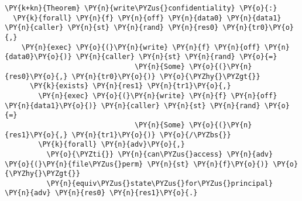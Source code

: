 \begin{BVerbatim}[commandchars=\\\{\},codes={\catcode`\$=3\catcode`\^=7\catcode`\_=8},fontsize=\footnotesize]
\PY{k+kn}{Theorem} \PY{n}{write\PYZus{}confidentiality} \PY{o}{:}
  \PY{k}{forall} \PY{n}{f} \PY{n}{off} \PY{n}{data0} \PY{n}{data1} \PY{n}{caller} \PY{n}{st} \PY{n}{rand} \PY{n}{res0} \PY{n}{tr0}\PY{o}{,}
    \PY{n}{exec} \PY{o}{(}\PY{n}{write} \PY{n}{f} \PY{n}{off} \PY{n}{data0}\PY{o}{)} \PY{n}{caller} \PY{n}{st} \PY{n}{rand} \PY{o}{=}
                               \PY{n}{Some} \PY{o}{(}\PY{n}{res0}\PY{o}{,} \PY{n}{tr0}\PY{o}{)} \PY{o}{\PYZhy{}\PYZgt{}}
      \PY{k}{exists} \PY{n}{res1} \PY{n}{tr1}\PY{o}{,}
        \PY{n}{exec} \PY{o}{(}\PY{n}{write} \PY{n}{f} \PY{n}{off} \PY{n}{data1}\PY{o}{)} \PY{n}{caller} \PY{n}{st} \PY{n}{rand} \PY{o}{=}
                               \PY{n}{Some} \PY{o}{(}\PY{n}{res1}\PY{o}{,} \PY{n}{tr1}\PY{o}{)} \PY{o}{/\PYZbs{}}
        \PY{k}{forall} \PY{n}{adv}\PY{o}{,}
          \PY{o}{\PYZti{}} \PY{n}{can\PYZus{}access} \PY{n}{adv} \PY{o}{(}\PY{n}{file\PYZus{}perm} \PY{n}{st} \PY{n}{f}\PY{o}{)} \PY{o}{\PYZhy{}\PYZgt{}}
          \PY{n}{equiv\PYZus{}state\PYZus{}for\PYZus{}principal} \PY{n}{adv} \PY{n}{res0} \PY{n}{res1}\PY{o}{.}
\end{BVerbatim}
